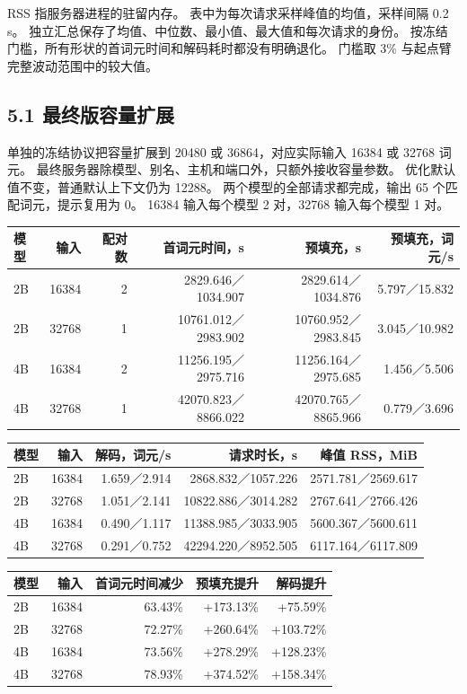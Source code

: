 \documentclass[10pt,a4paper,fontset=none]{ctexart}
\begin{document}
RSS 指服务器进程的驻留内存。 表中为每次请求采样峰值的均值，采样间隔 0.2
s。 独立汇总保存了均值、中位数、最小值、最大值和每次请求的身份。
按冻结门槛，所有形状的首词元时间和解码耗时都没有明确退化。 门槛取 3\%
与起点臂完整波动范围中的较大值。

\hypertarget{ux6700ux7ec8ux7248ux5bb9ux91cfux6269ux5c55}{%
\subsection{5.1
最终版容量扩展}\label{ux6700ux7ec8ux7248ux5bb9ux91cfux6269ux5c55}}

单独的冻结协议把容量扩展到 20480 或 36864，对应实际输入 16384 或 32768
词元。 最终服务器除模型、别名、主机和端口外，只额外接收容量参数。
优化默认值不变，普通默认上下文仍为 12288。
两个模型的全部请求都完成，输出 65 个匹配词元，提示复用为 0。 16384
输入每个模型 2 对，32768 输入每个模型 1 对。

\begin{longtable}[]{@{}lrrrrr@{}}
\toprule
模型 & 输入 & 配对数 & 首词元时间，s & 预填充，s &
预填充，词元/s\tabularnewline
\midrule
\endhead
2B & 16384 & 2 & 2829.646／1034.907 & 2829.614／1034.876 &
5.797／15.832\tabularnewline
2B & 32768 & 1 & 10761.012／2983.902 & 10760.952／2983.845 &
3.045／10.982\tabularnewline
4B & 16384 & 2 & 11256.195／2975.716 & 11256.164／2975.685 &
1.456／5.506\tabularnewline
4B & 32768 & 1 & 42070.823／8866.022 & 42070.765／8865.966 &
0.779／3.696\tabularnewline
\bottomrule
\end{longtable}

\begin{longtable}[]{@{}lrrrr@{}}
\toprule
模型 & 输入 & 解码，词元/s & 请求时长，s & 峰值 RSS，MiB\tabularnewline
\midrule
\endhead
2B & 16384 & 1.659／2.914 & 2868.832／1057.226 &
2571.781／2569.617\tabularnewline
2B & 32768 & 1.051／2.141 & 10822.886／3014.282 &
2767.641／2766.426\tabularnewline
4B & 16384 & 0.490／1.117 & 11388.985／3033.905 &
5600.367／5600.611\tabularnewline
4B & 32768 & 0.291／0.752 & 42294.220／8952.505 &
6117.164／6117.809\tabularnewline
\bottomrule
\end{longtable}

\begin{longtable}[]{@{}lrrrr@{}}
\toprule
模型 & 输入 & 首词元时间减少 & 预填充提升 & 解码提升\tabularnewline
\midrule
\endhead
2B & 16384 & 63.43\% & +173.13\% & +75.59\%\tabularnewline
2B & 32768 & 72.27\% & +260.64\% & +103.72\%\tabularnewline
4B & 16384 & 73.56\% & +278.29\% & +128.23\%\tabularnewline
4B & 32768 & 78.93\% & +374.52\% & +158.34\%\tabularnewline
\bottomrule
\end{longtable}
\end{document}
